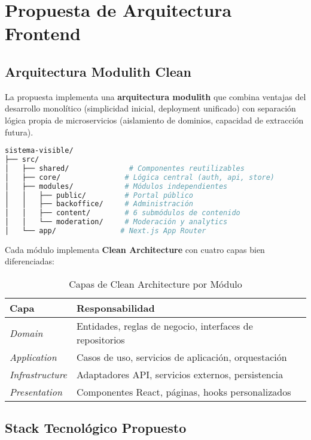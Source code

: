 \documentclass[12pt,a4paper]{article}
\begin{document}
\section{Propuesta de Arquitectura Frontend}

\subsection{Arquitectura Modulith Clean}

La propuesta implementa una \textbf{arquitectura modulith} que combina ventajas del desarrollo monolítico (simplicidad inicial, deployment unificado) con separación lógica propia de microservicios (aislamiento de dominios, capacidad de extracción futura).

\begin{lstlisting}[language=bash, caption=Estructura Modular Propuesta]
sistema-visible/
├── src/
│   ├── shared/              # Componentes reutilizables
│   ├── core/               # Lógica central (auth, api, store)
│   ├── modules/            # Módulos independientes
│   │   ├── public/         # Portal público
│   │   ├── backoffice/     # Administración
│   │   ├── content/        # 6 submódulos de contenido
│   │   └── moderation/     # Moderación y analytics
│   └── app/               # Next.js App Router
\end{lstlisting}

Cada módulo implementa \textbf{Clean Architecture} con cuatro capas bien diferenciadas:

\begin{table}[h!]
\centering
\begin{tabularx}{\textwidth}{|l|X|}
\hline
\textbf{Capa} & \textbf{Responsabilidad} \\
\hline
\textit{Domain} & Entidades, reglas de negocio, interfaces de repositorios \\
\hline
\textit{Application} & Casos de uso, servicios de aplicación, orquestación \\
\hline
\textit{Infrastructure} & Adaptadores API, servicios externos, persistencia \\
\hline
\textit{Presentation} & Componentes React, páginas, hooks personalizados \\
\hline
\end{tabularx}
\caption{Capas de Clean Architecture por Módulo}
\end{table}

\subsection{Stack Tecnológico Propuesto}
\end{document}
